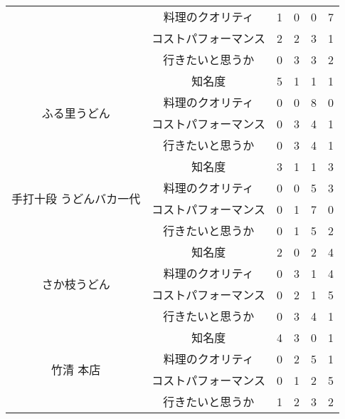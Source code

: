 \begin{table}[H]
{\begin{tabular}{|c|c|r|r|r|r|}
 & 料理のクオリティ & 1 & 0 & 0 & 7 \\ \cline{2-6}
 & コストパフォーマンス & 2 & 2 & 3 & 1 \\ \cline{2-6}
 & 行きたいと思うか & 0 & 3 & 3 & 2 \\ \hline
\multirow{4}{*}{ふる里うどん} & 知名度 & 5 & 1 & 1 & 1 \\ \cline{2-6}
 & 料理のクオリティ & 0 & 0 & 8 & 0 \\ \cline{2-6}
 & コストパフォーマンス & 0 & 3 & 4 & 1 \\ \cline{2-6}
 & 行きたいと思うか & 0 & 3 & 4 & 1 \\ \hline
\multirow{4}{*}{手打十段 うどんバカ一代} & 知名度 & 3 & 1 & 1 & 3 \\ \cline{2-6}
 & 料理のクオリティ & 0 & 0 & 5 & 3 \\ \cline{2-6}
 & コストパフォーマンス & 0 & 1 & 7 & 0 \\ \cline{2-6}
 & 行きたいと思うか & 0 & 1 & 5 & 2 \\ \hline
\multirow{4}{*}{さか枝うどん} & 知名度 & 2 & 0 & 2 & 4 \\ \cline{2-6}
 & 料理のクオリティ & 0 & 3 & 1 & 4 \\ \cline{2-6}
 & コストパフォーマンス & 0 & 2 & 1 & 5 \\ \cline{2-6}
 & 行きたいと思うか & 0 & 3 & 4 & 1 \\ \hline
\multirow{4}{*}{竹清 本店} & 知名度 & 4 & 3 & 0 & 1 \\ \cline{2-6}
 & 料理のクオリティ & 0 & 2 & 5 & 1 \\ \cline{2-6}
 & コストパフォーマンス & 0 & 1 & 2 & 5 \\ \cline{2-6}
 & 行きたいと思うか & 1 & 2 & 3 & 2 \\ \hline
\end{tabular}
}
\end{table}
